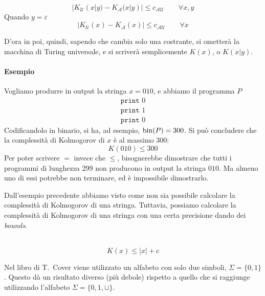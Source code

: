 \begin{corollary}
    ~
    $$
        |K_\mathcal{U}(x|y) - K_\mathcal{A}(x|y)| \leq c_{\mathcal{A}\mathcal{U}} \qquad \forall x,y
    $$
    Quando $y=\varepsilon$
    $$
        |K_\mathcal{U}(x) - K_\mathcal{A}(x)| \leq c_{\mathcal{A}\mathcal{U}} \qquad \forall x
    $$
\end{corollary}
D'ora in poi, quindi, sapendo che cambia solo una costrante, si ometterà la macchina di Turing universale, e si scriverà semplicemente $K(x)$, o $K(x|y)$.

\paragraph{Esempio} Vogliamo produrre in output la stringa $x=010$, e abbiamo il programma $P$
\begin{align*}
    \texttt{print }0\\
    \texttt{print }1\\
    \texttt{print }0
\end{align*}
Codificandolo in binario, si ha, ad esempio, $\operatorname*{bin}(P)=300$. Si può concludere che la complessità di Kolmogorov di $x$ è al massimo 300:
$$
    K(010) \leq 300
$$
Per poter scrivere $=$ invece che $\leq$, bisognerebbe dimostrare che tutti i programmi di lunghezza 299 non producono in output la stringa $010$. Ma almeno uno di essi potrebbe non terminare, ed è impossibile dimostrarlo.\bigskip

Dall'esempio precedente abbiamo visto come non sia possibile calcolare la complessità di Kolmogorov di una stringa. Tuttavia, possiamo calcolare la complessità di Kolmogorov di una stringa con una certa precisione dando dei \emph{bounds}.

\begin{theorem}~
    $$
        K(x) \leq |x| + c
    $$    
\end{theorem}
Nel libro di T.~Cover viene utilizzato un alfabeto con solo due simboli, $\Sigma=\{0,1\}$. Questo dà un risultato diverso (più debole) rispetto a quello che si raggiunge utilizzando l'alfabeto $\Sigma=\{0,1,\sqcup\}$.

